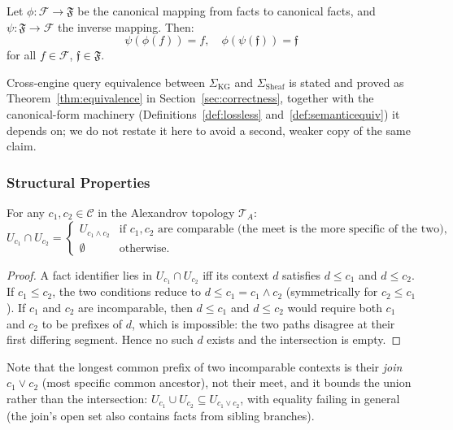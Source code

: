 \begin{theorem}
\label{thm:canonical}
Let $\phi: \mathcal{F} \to \mathfrak{F}$ be the canonical mapping from facts to canonical facts,
and $\psi: \mathfrak{F} \to \mathcal{F}$ the inverse mapping. Then:
\[
\psi(\phi(f)) = f,\quad \phi(\psi(\mathfrak{f})) = \mathfrak{f}
\]
for all $f \in \mathcal{F}$, $\mathfrak{f} \in \mathfrak{F}$.
\end{theorem}

Cross-engine query equivalence between $\Sigma_{\mathrm{KG}}$ and
$\Sigma_{\mathrm{Sheaf}}$ is stated and proved as
Theorem~\ref{thm:equivalence} in Section~\ref{sec:correctness}, together
with the canonical-form machinery (Definitions~\ref{def:lossless}
and~\ref{def:semanticequiv}) it depends on; we do not restate it here to
avoid a second, weaker copy of the same claim.

\subsubsection{Structural Properties}

\begin{theorem}
\label{thm:meet}
For any $c_1, c_2 \in \mathcal{C}$ in the Alexandrov topology $\mathcal{T}_A$:
\[
U_{c_1} \cap U_{c_2} =
\begin{cases}
U_{c_1 \wedge c_2} & \text{if } c_1, c_2 \text{ are comparable (the meet
is the more specific of the two)},\\
\emptyset & \text{otherwise.}
\end{cases}
\]
\end{theorem}

\begin{proof}
A fact identifier lies in $U_{c_1} \cap U_{c_2}$ iff its context $d$
satisfies $d \leq c_1$ and $d \leq c_2$. If $c_1 \leq c_2$, the two
conditions reduce to $d \leq c_1 = c_1 \wedge c_2$ (symmetrically for
$c_2 \leq c_1$). If $c_1$ and $c_2$ are incomparable, then $d \leq c_1$
and $d \leq c_2$ would require both $c_1$ and $c_2$ to be prefixes of
$d$, which is impossible: the two paths disagree at their first differing
segment. Hence no such $d$ exists and the intersection is empty.
\end{proof}

Note that the longest common prefix of two incomparable contexts is their
\emph{join} $c_1 \vee c_2$ (most specific common ancestor), not their
meet, and it bounds the union rather than the intersection:
$U_{c_1} \cup U_{c_2} \subseteq U_{c_1 \vee c_2}$, with equality failing
in general (the join's open set also contains facts from sibling
branches).


